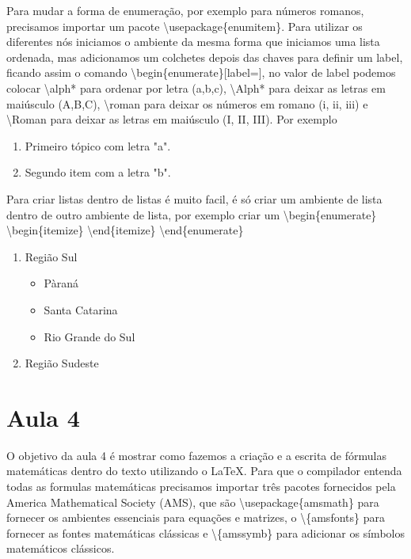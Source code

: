 Para mudar a forma de enumeração, por exemplo para números romanos, precisamos importar um pacote \textbackslash usepackage\{enumitem\}. Para utilizar os diferentes nós iniciamos o ambiente da mesma forma que iniciamos uma lista ordenada, mas adicionamos um colchetes depois das chaves para definir um label, ficando assim o comando \textbackslash begin\{enumerate\}[label=], no valor de label podemos colocar \textbackslash alph* para ordenar por letra (a,b,c), \textbackslash Alph* para deixar as letras em maiúsculo (A,B,C), \textbackslash roman para deixar os números em romano (i, ii, iii) e \textbackslash Roman para deixar as letras em maiúsculo (I, II, III). Por exemplo
\begin{enumerate}[label=\alph*]
    \item  Primeiro tópico com letra "a".
    \item Segundo item com a letra "b".
\end{enumerate}

Para criar listas dentro de listas é muito facil, é só criar um ambiente de lista dentro de outro ambiente de lista, por exemplo criar um \textbackslash begin\{enumerate\} \textbackslash begin\{itemize\} \textbackslash end\{itemize\} \textbackslash end\{enumerate\}

\begin{enumerate}
    \item Região Sul
    \begin{itemize}
        \item Pàraná
        \item Santa Catarina
        \item Rio Grande do Sul
    \end{itemize}
    \item Região Sudeste
\end{enumerate}






\section{Aula 4}
O objetivo da aula 4 é mostrar como fazemos a criação e a escrita de fórmulas matemáticas dentro do texto utilizando o \LaTeX. Para que o compilador entenda todas as formulas matemáticas precisamos importar três pacotes fornecidos pela America Mathematical Society (AMS), que são \textbackslash usepackage\{amsmath\} para fornecer os ambientes essenciais para equações e matrizes, o \textbackslash \{amsfonts\} para fornecer as fontes matemáticas clássicas e \textbackslash \{amssymb\} para adicionar os símbolos matemáticos clássicos.

